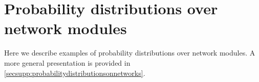 
\section{Probability distributions over network modules}\label{sec:probabilitydistributionsonnetworks}
Here we describe examples of probability distributions over network modules. A more general presentation is provided in  \ref{secsupp:probabilitydistributionsonnetworks}.

